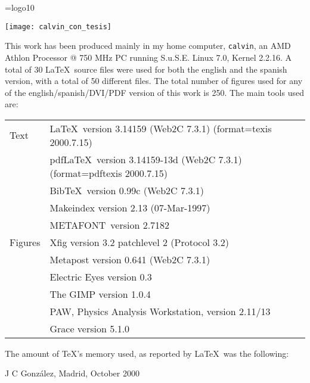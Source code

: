 
\thispagestyle{empty}
%
\mbox{}
%
\newpage
%
\thispagestyle{empty}
%
\mbox{}
%
\vfill
%
\scriptsize

\font\logo=logo10
\def\MF{\strut\hbox{\logo METAFONT}}\def\.#1{\strut\hbox{\tt #1}}

\begin{center}
  \texttt{[image: calvin\_con\_tesis]}
\end{center}

\vskip 2cm 

\noindent
This work has been produced mainly in my home computer,
\texttt{calvin}, an AMD Athlon Processor @ 750 MHz PC running S.u.S.E.
Linux 7.0, Kernel 2.2.16. A total of 30 \LaTeX\ source files were used
for both the english and the spanish version, with a total of 50
different files.  The total number of figures used for any of the
english/spanish/DVI/PDF version of this
work is 250. The main tools used are:\\

\begin{tabular}{ll}

Text
 & \LaTeX\ version 3.14159 (Web2C 7.3.1) (format=texis 2000.7.15)\\
 & pdf\LaTeX\ version 3.14159-13d (Web2C 7.3.1) (format=pdftexis 2000.7.15)\\
 & Bib\TeX\ version 0.99c (Web2C 7.3.1)\\
 & Makeindex version 2.13 (07-Mar-1997)\\
 & \MF\ version 2.7182 \vspace{4pt}\\

Figures
 & Xfig  version 3.2 patchlevel 2 (Protocol 3.2)\\
 & Metapost version 0.641 (Web2C 7.3.1)\\
 & Electric Eyes version 0.3\\
 & The GIMP version 1.0.4\\
 & PAW, Physics Analysis Workstation, version 2.11/13 \\
 & Grace version 5.1.0\\

\end{tabular}

\vskip 20pt

\noindent
The amount of \TeX's memory used, as reported by \LaTeX\, was the
following:



\vskip 20pt

\raggedleft J C Gonz\'alez, Madrid, October 2000

\endinput
%
